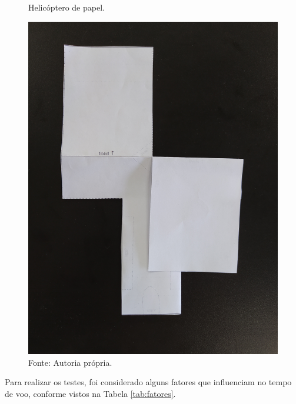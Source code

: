 

\begin{figure}[H]
  \caption{Helicóptero de papel.}
  \centering
  \includegraphics[width=1\textwidth]{images/IMG_20200918_162251.jpg}
  \caption*{Fonte: Autoria própria.}
  \label{fig:heli_papel}
\end{figure}

Para realizar os testes, foi considerado alguns fatores que influenciam no tempo de voo, conforme vistos na Tabela \ref{tab:fatores}.

